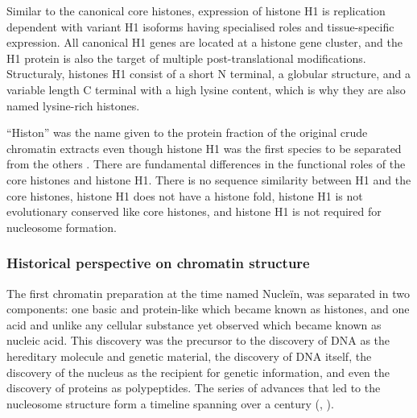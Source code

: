       Similar to the canonical core histones, expression of histone H1 is
      replication dependent with variant H1 isoforms having specialised
      roles and tissue-specific expression.  All canonical H1 genes
      are located at a histone gene cluster, and the H1 protein
      is also the target of multiple post-translational modifications.
      Structuraly, histones H1 consist of a short N terminal, a globular
      structure, and a variable length C terminal with a high lysine
      content, which is why they are also named lysine-rich histones.

      ``Histon'' was the name given to the protein fraction of
      the original crude chromatin extracts \citep{kossel1884-histones}
      even though histone H1 was the first species to be separated from
      the others \citep{stedman1951main-histones-separation}.
      There are fundamental differences in the functional roles of
      the core histones and histone H1.
      There is no sequence similarity between H1 and the core histones,
      histone H1 does not have a histone fold,
      histone H1 is not evolutionary conserved like core histones,
      and histone H1 is not required for nucleosome formation.

    \subsubsection{Historical perspective on chromatin structure}

      The first chromatin preparation \citep{kossel1884-histones}
      at the time named Nucleïn, was
      separated in two components: one basic and protein-like which
      became known as histones, and one acid and unlike any cellular
      substance yet observed which became known as nucleic acid.
      This discovery was the precursor to the discovery of DNA as the hereditary
      molecule and genetic material, the discovery of DNA itself,
      the discovery of the nucleus as the recipient for genetic
      information, and even the discovery of proteins as polypeptides.
      The series of advances that led to the nucleosome
      structure form a timeline spanning over a century
      (,
      \cite{vanHolde-chapter1}).

